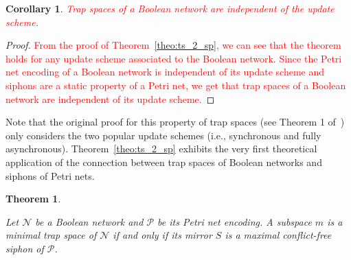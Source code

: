 \documentclass[preprint,12pt]{elsarticle}
\newtheorem{theorem}{Theorem}[section]
\newtheorem{corollary}{Corollary}[section]
\newcommand{\change}[1]{\textcolor{red}{#1}}
\begin{document}
\begin{corollary}\label{cor:indep}
  \change{Trap spaces of a Boolean network are independent of the update scheme.}
\end{corollary}

\begin{proof}
\change{From the proof of Theorem~\ref{theo:ts_2_sp}, we can see that the theorem holds for any update scheme associated to the Boolean network.
Since the Petri net encoding of a Boolean network is independent of its update scheme and siphons are a static property of a Petri net, we get that trap spaces of a Boolean network are independent of its update scheme.}
\end{proof}

Note that the original proof for this property of trap spaces (see Theorem 1 of~\cite{klarner2015computing}) only considers the two popular update schemes (i.e., synchronous and fully asynchronous).
Theorem~\ref{theo:ts_2_sp} exhibits the very first theoretical application of the connection between trap spaces of Boolean networks and siphons of Petri nets.

\begin{theorem}%
\label{theo:min_ts_2_max_sp}

  Let \(\mathcal{N}\) be a Boolean network and \(\mathcal{P}\) be its Petri net encoding. A subspace \(m\) is a minimal trap space of \(\mathcal{N}\) if and only if its mirror \(S\) is a maximal conflict-free siphon of \(\mathcal{P}\).

\end{theorem}
\end{document}
